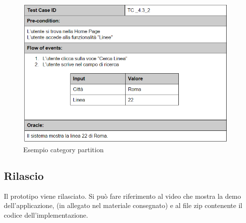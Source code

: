 \begin{figure}[h]
\centering
\includegraphics[scale=.6]{img/23.png}
\caption{Esempio category partition }
\label{fig:mhs}
\end{figure} 

\subsection{Rilascio}
Il prototipo viene rilasciato. Si pu\`{o} fare riferimento al video che mostra la demo dell\rq applicazione, (in allegato nel materiale consegnato) e al file zip contenente il codice dell\rq implementazione.
